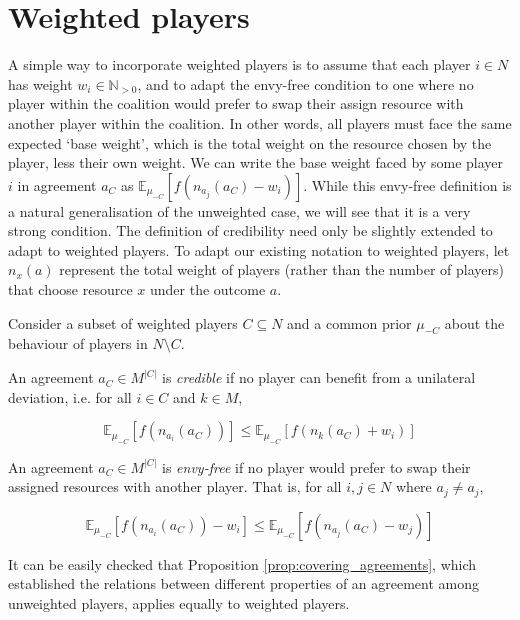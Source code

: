 \section{Weighted players}


A simple way to incorporate weighted players is to assume that each player $i \in N$ has weight $w_i \in \mathbb{N}_{>0}$, and to adapt the envy-free condition to one where no player within the coalition would prefer to swap their assign resource with another player within the coalition. In other words, all players must face the same expected `base weight', which is the total weight on the resource chosen by the player, less their own weight. We can write the base weight faced by some player $i$ in agreement $a_C$ as $\mathbb{E}_{\mu_{-C}}[f(n_{a_j}(a_C) - w_i)]$. While this envy-free definition is a natural generalisation of the unweighted case, we will see that it is a very strong condition. The definition of credibility need only be slightly extended to adapt to weighted players. To adapt our existing notation to weighted players, let $n_x(a)$ represent the total weight of players (rather than the number of players) that choose resource $x$ under the outcome $a$.

\begin{definition}
    Consider a subset of weighted players $C \subseteq N$ and a common prior $\mu_{-C}$ about the behaviour of players in $N \setminus C$. 
    
    An agreement $a_C \in M^{|C|}$ is \textit{credible} if no player can benefit from a unilateral deviation, i.e. for all $i \in C$ and $k \in M$,

    \[ \mathbb{E}_{\mu_{-C}}[f(n_{a_i}(a_C))] \leq \mathbb{E}_{\mu_{-C}}[f(n_k(a_C) + w_i)] \]

    An agreement $a_C \in M^{|C|}$ is \textit{envy-free} if no player would prefer to swap their assigned resources with another player. That is, for all $i, j \in N$ where $a_j \neq a_j$,

    \[ \mathbb{E}_{\mu_{-C}}[f(n_{a_i}(a_C)) - w_i] \leq \mathbb{E}_{\mu_{-C}}[f(n_{a_j}(a_C) - w_j)] \]
\end{definition}

It can be easily checked that Proposition \ref{prop:covering_agreements}, which established the relations between different properties of an agreement among unweighted players, applies equally to weighted players. 

